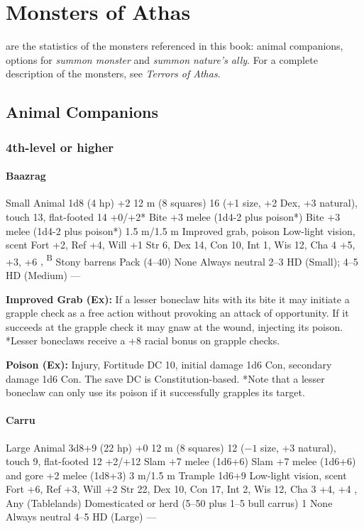 \chapter{Monsters of Athas}
 are the statistics of the monsters referenced in this book: animal companions, options for \emph{summon monster} and \emph{summon nature's ally}. For a complete description of the monsters, see \emph{Terrors of Athas}.

\section{Animal Companions}
\subsection{4th-level or higher}
\subsubsection{Baazrag}
\begin{MonsterStats}
{Small Animal}
{1d8 (4 hp)}
{+2}
{12 m (8 squares)}
{16 (+1 size, +2 Dex, +3 natural), touch 13, flat-footed 14}
{+0/+2*}
{Bite +3 melee (1d4-2 plus poison*)}
{Bite +3 melee (1d4-2 plus poison*)}
{1.5 m/1.5 m}
{Improved grab, poison}
{Low-light vision, scent}
{Fort +2, Ref +4, Will +1}
{Str 6, Dex 14, Con 10, Int 1, Wis 12, Cha 4}
{ +5,  +3,  +6}
{, \textsuperscript{B}}
{Stony barrens}
{Pack (4--40)}
{\onehalf}
{None}
{Always neutral}
{2--3 HD (Small); 4--5 HD (Medium)}
{---}
\end{MonsterStats}

\textbf{Improved Grab (Ex):} If a lesser boneclaw hits with its bite it may initiate a grapple check as a free action without provoking an attack of opportunity. If it succeeds at the grapple check it may gnaw at the wound, injecting its poison. *Lesser boneclaws receive a +8 racial bonus on grapple checks.

\textbf{Poison (Ex):} Injury, Fortitude DC 10, initial damage 1d6 Con, secondary damage 1d6 Con. The save DC is Constitution-based. *Note that a lesser boneclaw can only use its poison if it successfully grapples its target.

\subsubsection{Carru}
\begin{MonsterStats}
{Large Animal}
{3d8+9 (22 hp)}
{+0}
{12 m (8 squares)}
{12 ($-1$ size, +3 natural), touch 9, flat-footed 12}
{+2/+12}
{Slam +7 melee (1d6+6)}
{Slam +7 melee (1d6+6) and gore +2 melee (1d8+3)}
{3 m/1.5 m}
{Trample 1d6+9}
{Low-light vision, scent}
{Fort +6, Ref +3, Will +2}
{Str 22, Dex 10, Con 17, Int 2, Wis 12, Cha 3}
{ +4,  +4}
{, }
{Any (Tablelands)}
{Domesticated or herd (5--50 plus 1--5 bull carrus)}
{1}
{None}
{Always neutral}
{4--5 HD (Large)}
{---}
\end{MonsterStats}

